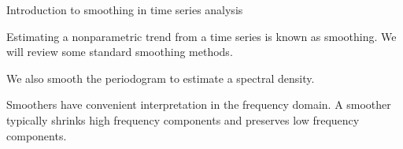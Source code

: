\begin{frame}{Introduction to smoothing in time series analysis}



\bi
\item   Estimating a nonparametric trend from a time series is known as smoothing. We will review some standard smoothing methods.

\item We also smooth the periodogram to estimate a spectral density.

\item Smoothers have convenient interpretation in the frequency domain. A smoother typically shrinks high frequency components and preserves low frequency components.

\ei

\end{frame}


